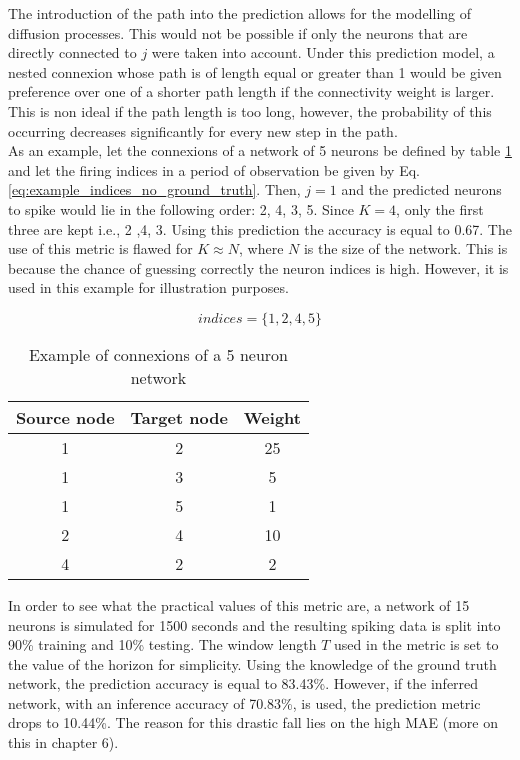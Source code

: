 The introduction of the path into the prediction allows for the modelling of diffusion processes. This would not be possible if only the neurons that are directly connected to \(j\) were taken into account. Under this prediction model, a nested connexion whose path is of length equal or greater than 1 would be given preference over one of a shorter path length if the connectivity weight is larger. This is non ideal if the path length is too long, however, the probability of this occurring decreases significantly for every new step in the path. \\

As an example, let the connexions of a network of 5 neurons be defined by table \ref{tab:example_connexions_no_ground_truth} and let the firing indices in a period of observation be given by Eq.\ref{eq:example_indices_no_ground_truth}. Then, \(j=1\) and the predicted neurons to spike would lie in the following order: 2, 4, 3, 5. Since \(K=4\), only the first three are kept i.e., 2 ,4, 3. Using this prediction the accuracy is equal to 0.67. The use of this metric is flawed for \(K\approx N\), where \(N\) is the size of the network. This is because the chance of guessing correctly the neuron indices is high. However, it is used in this example for illustration purposes.

\begin{equation}
indices = \{1, 2, 4, 5\}
\label{eq:example_indices_no_ground_truth}
\end{equation}

\begin{table}[]
\centering
\begin{tabular}{|c|c|c|}
\hline
Source node & Target node & Weight \\ \hline
1           & 2           & 25     \\ \hline
1           & 3           & 5      \\ \hline
1           & 5           & 1      \\ \hline
2           & 4           & 10     \\ \hline
4           & 2           & 2      \\ \hline
\end{tabular}
\caption{Example of connexions of a 5 neuron network}
\label{tab:example_connexions_no_ground_truth}
\end{table}

In order to see what the practical values of this metric are, a network of 15 neurons is simulated for 1500 seconds and the resulting spiking data is split into 90\% training and 10\% testing. The window length \(T\) used in the metric is set to the value of the horizon for simplicity. Using the knowledge of the ground truth network, the prediction accuracy is equal to 83.43\%. However, if the inferred network, with an inference accuracy of 70.83\%, is used, the prediction metric drops to 10.44\%. The reason for this drastic fall lies on the high MAE (more on this in chapter 6).
